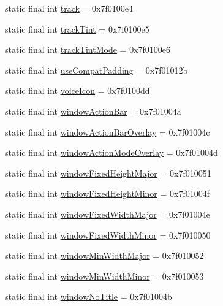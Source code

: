\begin{CompactItemize}
static final int \hyperlink{classandroid_1_1support_1_1v7_1_1recyclerview_1_1_r_1_1attr_c969bb58ffc3737c1d0cd372bad07a15}{track} = 0x7f0100e4
\item 
static final int \hyperlink{classandroid_1_1support_1_1v7_1_1recyclerview_1_1_r_1_1attr_59b4e6a3106470a6ed145d67aa2c3e3e}{trackTint} = 0x7f0100e5
\item 
static final int \hyperlink{classandroid_1_1support_1_1v7_1_1recyclerview_1_1_r_1_1attr_a3da788d6d59d3a3a38e32d192ff8178}{trackTintMode} = 0x7f0100e6
\item 
static final int \hyperlink{classandroid_1_1support_1_1v7_1_1recyclerview_1_1_r_1_1attr_606d9e323cd79fc981c3e726a4df97a2}{useCompatPadding} = 0x7f01012b
\item 
static final int \hyperlink{classandroid_1_1support_1_1v7_1_1recyclerview_1_1_r_1_1attr_b353e023ff448db4d45d0ee54dcc7ea4}{voiceIcon} = 0x7f0100dd
\item 
static final int \hyperlink{classandroid_1_1support_1_1v7_1_1recyclerview_1_1_r_1_1attr_8bcc2f030b343fa1557913aa87c56772}{windowActionBar} = 0x7f01004a
\item 
static final int \hyperlink{classandroid_1_1support_1_1v7_1_1recyclerview_1_1_r_1_1attr_4e5e04df217d376d8a4c37444880dad7}{windowActionBarOverlay} = 0x7f01004c
\item 
static final int \hyperlink{classandroid_1_1support_1_1v7_1_1recyclerview_1_1_r_1_1attr_d26a3b0a625a8ba19ff21a835627a2a6}{windowActionModeOverlay} = 0x7f01004d
\item 
static final int \hyperlink{classandroid_1_1support_1_1v7_1_1recyclerview_1_1_r_1_1attr_0a7f5585fdf01d004469e1f589b42e4a}{windowFixedHeightMajor} = 0x7f010051
\item 
static final int \hyperlink{classandroid_1_1support_1_1v7_1_1recyclerview_1_1_r_1_1attr_d0be12419b88834c4de5eeeedbce14c9}{windowFixedHeightMinor} = 0x7f01004f
\item 
static final int \hyperlink{classandroid_1_1support_1_1v7_1_1recyclerview_1_1_r_1_1attr_6b4523c344e7065595bdd942c6365a79}{windowFixedWidthMajor} = 0x7f01004e
\item 
static final int \hyperlink{classandroid_1_1support_1_1v7_1_1recyclerview_1_1_r_1_1attr_240f579b402c06de047efc02a571359b}{windowFixedWidthMinor} = 0x7f010050
\item 
static final int \hyperlink{classandroid_1_1support_1_1v7_1_1recyclerview_1_1_r_1_1attr_e2de3eb1ac20bc496dccdb0d1b7fdd50}{windowMinWidthMajor} = 0x7f010052
\item 
static final int \hyperlink{classandroid_1_1support_1_1v7_1_1recyclerview_1_1_r_1_1attr_d7224824eab56b433ba0cc55537fabf0}{windowMinWidthMinor} = 0x7f010053
\item 
static final int \hyperlink{classandroid_1_1support_1_1v7_1_1recyclerview_1_1_r_1_1attr_21ddcdaea4b7864c5ce6933f5089a61d}{windowNoTitle} = 0x7f01004b
\end{CompactItemize}


